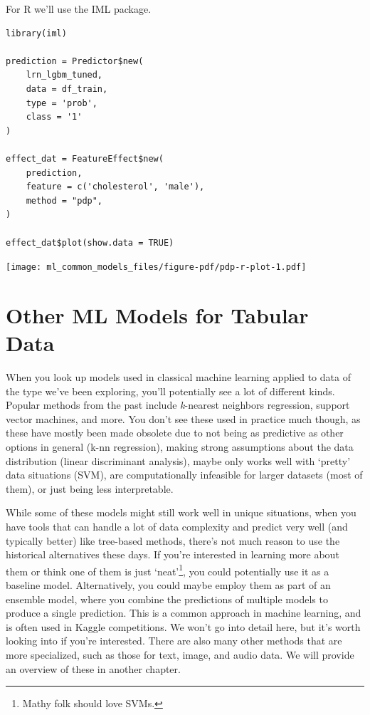 \documentclass[
  letterpaper,
]{krantz}
\begin{document}
For R we'll use the IML package.

\begin{verbatim}
library(iml)

prediction = Predictor$new(
    lrn_lgbm_tuned, 
    data = df_train, 
    type = 'prob', 
    class = '1'
)

effect_dat = FeatureEffect$new(
    prediction, 
    feature = c('cholesterol', 'male'), 
    method = "pdp", 
)

effect_dat$plot(show.data = TRUE)
\end{verbatim}

\texttt{[image: ml\_common\_models\_files/figure-pdf/pdp-r-plot-1.pdf]}

\section{Other ML Models for Tabular Data}\label{sec-ml-other-models}

When you look up models used in classical machine learning applied to
data of the type we've been exploring, you'll potentially see a lot of
different kinds. Popular methods from the past include \emph{k}-nearest
neighbors regression, support vector machines, and more. You don't see
these used in practice much though, as these have mostly been made
obsolete due to not being as predictive as other options in general
(k-nn regression), making strong assumptions about the data distribution
(linear discriminant analysis), maybe only works well with `pretty' data
situations (SVM), are computationally infeasible for larger datasets
(most of them), or just being less interpretable.

While some of these models might still work well in unique situations,
when you have tools that can handle a lot of data complexity and predict
very well (and typically better) like tree-based methods, there's not
much reason to use the historical alternatives these days. If you're
interested in learning more about them or think one of them is just
`neat'\footnote{Mathy folk should love SVMs.}, you could potentially use
it as a baseline model. Alternatively, you could maybe employ them as
part of an ensemble model, where you combine the predictions of multiple
models to produce a single prediction. This is a common approach in
machine learning, and is often used in Kaggle competitions. We won't go
into detail here, but it's worth looking into if you're interested.
There are also many other methods that are more specialized, such as
those for text, image, and audio data. We will provide an overview of
these in another chapter.
\end{document}
